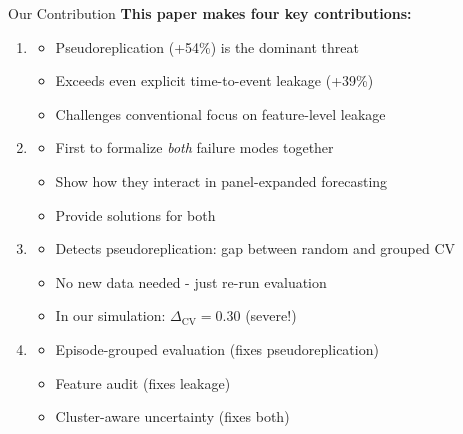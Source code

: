 \documentclass[aspectratio=169]{beamer}
\begin{document}
\begin{frame}{Our Contribution}
\textbf{This paper makes four key contributions:}

\vspace{1em}
\begin{enumerate}
\item {}
\begin{itemize}
\item \alert{Pseudoreplication (+54\%) is the dominant threat}
\item Exceeds even explicit time-to-event leakage (+39\%)
\item Challenges conventional focus on feature-level leakage
\end{itemize}

\vspace{0.5em}
\item {}
\begin{itemize}
\item First to formalize \textit{both} failure modes together
\item Show how they interact in panel-expanded forecasting
\item Provide solutions for both
\end{itemize}

\vspace{0.5em}
\item {}
\begin{itemize}
\item Detects pseudoreplication: gap between random and grouped CV
\item No new data needed - just re-run evaluation
\item In our simulation: $\Delta_{\text{CV}} = 0.30$ (severe!)
\end{itemize}

\vspace{0.5em}
\item {}
\begin{itemize}
\item Episode-grouped evaluation (fixes pseudoreplication)
\item Feature audit (fixes leakage)
\item Cluster-aware uncertainty (fixes both)
\end{itemize}
\end{enumerate}
\end{frame}
\end{document}
